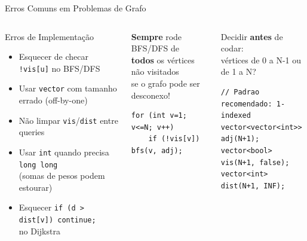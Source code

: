 \documentclass[aspectratio=169,10pt]{beamer}
\begin{document}
\begin{frame}[fragile]{Erros Comuns em Problemas de Grafo}
  \begin{columns}[t]
      \begin{alertblock}{Erros de Implementação}
        \begin{itemize}\footnotesize
          \item Esquecer de checar \texttt{!vis[u]} no BFS/DFS
          \item Usar \texttt{vector} com tamanho errado (off-by-one)
          \item Não limpar \texttt{vis}/\texttt{dist} entre queries
          \item Usar \texttt{int} quando precisa \texttt{long long}\\
                (somas de pesos podem estourar)
          \item Esquecer \texttt{if (d > dist[v]) continue;}\\
                no Dijkstra
        \end{itemize}
      \end{alertblock}
      \vspace{0.1cm}
      \begin{tcolorbox}[caixaVermelho,title={Armadilha: grafos desconexos}]
        \footnotesize
        \textbf{Sempre} rode BFS/DFS de\\
        \textbf{todos} os vértices não visitados\\
        se o grafo pode ser desconexo!\\[3pt]
        \begin{lstlisting}[style=cppsmall,numbers=none]
for (int v=1; v<=N; v++)
    if (!vis[v]) bfs(v, adj);
        \end{lstlisting}
      \end{tcolorbox}
      \begin{tcolorbox}[caixaAmarelo,title={Armadilha: índice 0 vs 1}]
        \footnotesize
        Decidir \textbf{antes} de codar:\\
        vértices de 0 a N-1 ou de 1 a N?\\[3pt]
        \begin{lstlisting}[style=cppsmall,numbers=none]
// Padrao recomendado: 1-indexed
vector<vector<int>> adj(N+1);
vector<bool> vis(N+1, false);
vector<int> dist(N+1, INF);
        \end{lstlisting}

\end{tcolorbox}
\end{columns}
\end{frame}
\end{document}
